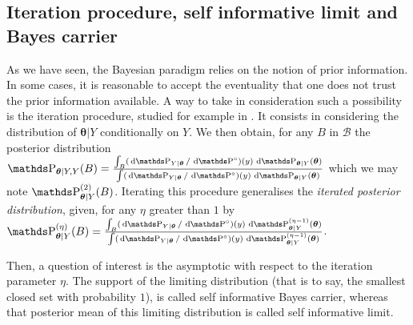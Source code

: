 \subsection{Iteration procedure, self informative limit and Bayes carrier}\label{INTRO_BAYES_ITERATIVE}
As we have seen, the Bayesian paradigm relies on the notion of prior information.
In some cases, it is reasonable to accept the eventuality that one does not trust the prior information available.
A way to take in consideration such a possibility is the iteration procedure, studied for example in .
It consists in considering the distribution of $\boldsymbol{\theta} \vert Y$ conditionally on $Y$.
We then obtain, for any $B$ in $\mathcal{B}$ the posterior distribution $\P_{\boldsymbol{\theta} \vert Y, Y}(B) = \tfrac{\int_{B} (\d \P_{Y \vert \boldsymbol{\theta}}/\d \P^{\circ})(y) \d \P_{\boldsymbol{\theta} \vert Y}(\boldsymbol{\theta})}{\int (\d \P_{Y \vert \boldsymbol{\theta}}/\d \P^{\circ})(y) \d \P_{\boldsymbol{\theta} \vert Y}(\boldsymbol{\theta})}$ which we may note $\P_{\boldsymbol{\theta} \vert Y}^{(2)}(B)$.
Iterating this procedure generalises the \textit{iterated posterior distribution}, given, for any $\eta$ greater than $1$ by $\P_{\boldsymbol{\theta} \vert Y}^{(\eta)}(B) = \tfrac{\int_{B} (\d \P_{Y \vert \boldsymbol{\theta}}/\d \P^{\circ})(y) \d \P_{\boldsymbol{\theta} \vert Y}^{(\eta - 1)}(\boldsymbol{\theta})}{\int (\d \P_{Y \vert \boldsymbol{\theta}}/\d \P^{\circ})(y) \d \P_{\boldsymbol{\theta} \vert Y}^{(\eta - 1)}(\boldsymbol{\theta})}$.

Then, a question of interest is the asymptotic with respect to the iteration parameter $\eta$.
The support of the limiting distribution (that is to say, the smallest closed set with probability $1$), is called self informative Bayes carrier, whereas that posterior mean of this limiting distribution is called self informative limit.

